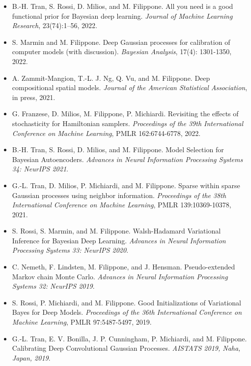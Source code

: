 \documentclass[oneside, a4paper, onecolumn, 10pt]{article}
\begin{document}
\linespread{0.9}
\selectfont

\begin{itemize}
  \setlength\itemsep{4pt}
\item  B.-H. Tran, S. Rossi, D. Milios, and M. Filippone. All you need is a good functional prior for Bayesian deep learning. \emph{Journal of Machine Learning Research}, 23(74):1--56, 2022.
\item  S. Marmin and M. Filippone. Deep Gaussian processes for calibration of computer models (with discussion). \emph{Bayesian Analysis}, 17(4): 1301-1350, 2022.
\item  A. Zammit-Mangion, T.-L. J. Ng, Q. Vu, and M. Filippone. Deep compositional spatial models. \emph{Journal of the American Statistical Association}, in press, 2021.
\item  G. Franzese, D. Milios, M. Filippone, P. Michiardi. Revisiting the effects of stochasticity for Hamiltonian samplers. \emph{Proceedings of the 39th International Conference on Machine Learning}, PMLR 162:6744-6778, 2022.
\item  B.-H. Tran, S. Rossi, D. Milios, and M. Filippone. Model Selection for Bayesian Autoencoders. \emph{Advances in Neural Information Processing Systems 34: NeurIPS 2021}.  
\item  G.-L. Tran, D. Milios, P. Michiardi, and M. Filippone. Sparse within sparse Gaussian processes using neighbor information. \emph{Proceedings of the 38th International Conference on Machine Learning}, PMLR 139:10369-10378, 2021.
\item  S. Rossi, S. Marmin, and M. Filippone. Walsh-Hadamard Variational Inference for Bayesian Deep Learning. \emph{Advances in Neural Information Processing Systems 33: NeurIPS 2020}.  
\item  C. Nemeth, F. Lindsten, M. Filippone, and J. Hensman. Pseudo-extended Markov chain Monte Carlo. \emph{Advances in Neural Information Processing Systems 32: NeurIPS 2019}. %
\item  S. Rossi, P. Michiardi, and M. Filippone. Good Initializations of Variational Bayes for Deep Models. \emph{Proceedings of the 36th International Conference on Machine Learning}, PMLR 97:5487-5497, 2019.  
\item  G.-L. Tran, E. V. Bonilla, J. P. Cunningham, P. Michiardi, and M. Filippone. Calibrating Deep Convolutional Gaussian Processes. \emph{AISTATS 2019, Naha, Japan, 2019}.  

\end{itemize}
\end{document}

